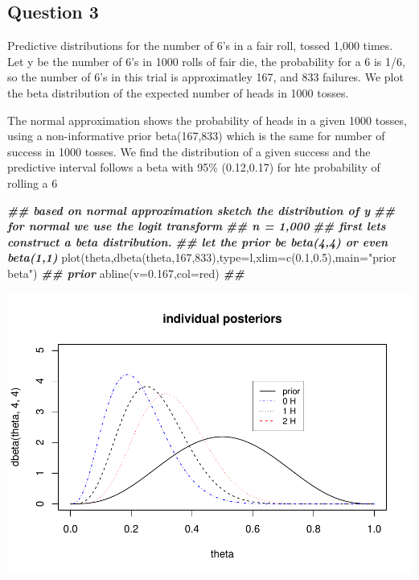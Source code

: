 \documentclass[
]{book}
\newenvironment{Shaded}{\begin{snugshade}}{\end{snugshade}}
\newcommand{\AttributeTok}[1]{\textcolor[rgb]{0.77,0.63,0.00}{#1}}
\newcommand{\DecValTok}[1]{\textcolor[rgb]{0.00,0.00,0.81}{#1}}
\newcommand{\DocumentationTok}[1]{\textcolor[rgb]{0.56,0.35,0.01}{\textbf{\textit{#1}}}}
\newcommand{\FloatTok}[1]{\textcolor[rgb]{0.00,0.00,0.81}{#1}}
\newcommand{\FunctionTok}[1]{\textcolor[rgb]{0.00,0.00,0.00}{#1}}
\newcommand{\NormalTok}[1]{#1}
\newcommand{\StringTok}[1]{\textcolor[rgb]{0.31,0.60,0.02}{#1}}
\theoremstyle{definition}
\theoremstyle{definition}
\theoremstyle{definition}
\theoremstyle{definition}
\theoremstyle{remark}
\begin{document}
\hypertarget{question-3}{%
\subsection*{Question 3}\label{question-3}}

Predictive distributions for the number of 6's in a fair roll, tossed 1,000 times. Let y be the number of 6's in 1000 rolls of fair die, the probability for a 6 is 1/6, so the number of 6's in this trial is approximatley 167, and 833 failures. We plot the beta distribution of the expected number of heads in 1000 tosses.

The normal approximation shows the probability of heads in a given 1000 tosses, using a non-informative prior beta(167,833) which is the same for number of success in 1000 tosses. We find the distribution of a given success and the predictive interval follows a beta with 95\% (0.12,0.17) for hte probability of rolling a 6

\begin{Shaded}
\begin{Highlighting}[]
  \DocumentationTok{\#\# based on normal approximation sketch the distribution of y}
  \DocumentationTok{\#\# for normal we use the logit transform}
  \DocumentationTok{\#\# n = 1,000}
  \DocumentationTok{\#\# first lets construct a beta distribution.}
  \DocumentationTok{\#\# let the prior be beta(4,4) or even beta(1,1)}
    \FunctionTok{plot}\NormalTok{(theta,}\FunctionTok{dbeta}\NormalTok{(theta,}\DecValTok{167}\NormalTok{,}\DecValTok{833}\NormalTok{),}\AttributeTok{type=}\StringTok{\textquotesingle{}l\textquotesingle{}}\NormalTok{,}\AttributeTok{xlim=}\FunctionTok{c}\NormalTok{(}\FloatTok{0.1}\NormalTok{,}\FloatTok{0.5}\NormalTok{),}\AttributeTok{main=}\StringTok{"prior beta"}\NormalTok{) }\DocumentationTok{\#\# prior}
    \FunctionTok{abline}\NormalTok{(}\AttributeTok{v=}\FloatTok{0.167}\NormalTok{,}\AttributeTok{col=}\StringTok{\textquotesingle{}red\textquotesingle{}}\NormalTok{) }\DocumentationTok{\#\# }
\end{Highlighting}
\end{Shaded}

\includegraphics{_main_files/figure-latex/unnamed-chunk-11-1.pdf}
\end{document}
